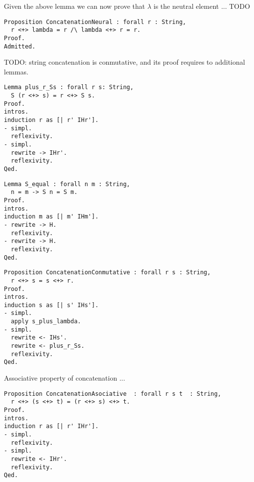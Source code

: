 Given the above lemma we can now prove that $\lambda$ is the neutral element ... {\color{red} TODO}

\begin{sourcecode}
{\scriptsize \begin{verbatim}
Proposition ConcatenationNeural : forall r : String,
  r <+> lambda = r /\ lambda <+> r = r.
Proof.
Admitted.
\end{verbatim}}
\end{sourcecode}

{\color{red} TODO: string concatenation is conmutative, and its proof requires to additional lemmas.}

\begin{sourcecode}
{\scriptsize \begin{verbatim}
Lemma plus_r_Ss : forall r s: String,
  S (r <+> s) = r <+> S s.
Proof.
intros.
induction r as [| r' IHr'].
- simpl.
  reflexivity.
- simpl.
  rewrite -> IHr'.
  reflexivity.
Qed.
\end{verbatim}}
\end{sourcecode}

\begin{sourcecode}
{\scriptsize \begin{verbatim}
Lemma S_equal : forall n m : String,
  n = m -> S n = S m.
Proof.
intros.
induction m as [| m' IHm'].
- rewrite -> H.
  reflexivity.
- rewrite -> H.
  reflexivity.
Qed.
\end{verbatim}}
\end{sourcecode}

\begin{sourcecode}
{\scriptsize \begin{verbatim}
Proposition ConcatenationConmutative : forall r s : String,
  r <+> s = s <+> r.
Proof.
intros.
induction s as [| s' IHs'].
- simpl.
  apply s_plus_lambda.
- simpl.
  rewrite <- IHs'.
  rewrite <- plus_r_Ss.
  reflexivity.
Qed.
\end{verbatim}}
\end{sourcecode}

{\color{red} Associative property of concatenation ... }

\begin{sourcecode}
{\scriptsize \begin{verbatim}
Proposition ConcatenationAsociative  : forall r s t  : String,
  r <+> (s <+> t) = (r <+> s) <+> t.
Proof.
intros.
induction r as [| r' IHr'].
- simpl.
  reflexivity.
- simpl.
  rewrite <- IHr'.
  reflexivity.
Qed.
\end{verbatim}}
\end{sourcecode}


